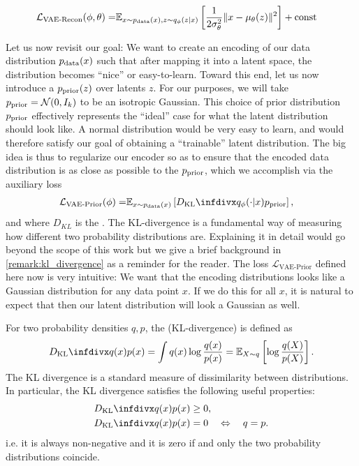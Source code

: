 \begin{align}
\mathcal{L}_{\text{VAE-Recon}}(\phi,\theta)=&\mathbb{E}_{x \sim p_{\rm{data}}(x),z\sim q_\phi(z|x)} \left[\frac{1}{2\sigma_\theta^2}\|x-\mu_\theta(z)\|^2\right]+\text{const}
\end{align}


Let us now revisit our goal: We want to create an encoding of our data distribution $p_{\rm{data}}(x)$ such that after mapping it into a latent space, the distribution becomes ``nice'' or easy-to-learn. Toward this end, let us now introduce a  $p_{\text{prior}}(z)$ over latents $z$. For our purposes, we will take $p_{\text{prior}}=\mathcal{N}(0,I_k)$ to be an isotropic Gaussian. This choice of prior distribution $p_{\text{prior}}$ effectively represents the ``ideal'' case for what the latent distribution should look like. A normal distribution would be very easy to learn, and would therefore satisfy our goal of obtaining a ``trainable'' latent distribution. The big idea is thus to regularize our encoder so as to ensure that the encoded data distribution is as close as possible to the $p_{\text{prior}}$, which we accomplish via the auxiliary loss
\begin{align}
\mathcal{L}_{\text{VAE-Prior}}(\phi)=&\EE_{x \sim \pdata(x)} \left[\dkl{q_\phi(\cdot|x)}{\prior}\right],
\end{align}
and where $D_{KL}$ is the  . The KL-divergence is a fundamental way of measuring how different two probability distributions are. Explaining it in detail would go beyond the scope of this work but we give a brief background in \cref{remark:kl_divergence} as a reminder for the reader.  The loss $\mathcal{L}_{\text{VAE-Prior}}$ defined here now is very intuitive: We want that the encoding distributions looks like a Gaussian distribution for any data point $x$. If we do this for all $x$, it is natural to expect that then our latent distribution will look a Gaussian as well.
\begin{remarkbox}
\label{remark:kl_divergence}
For two probability densities $q,p$, the  (KL-divergence) is defined as
\begin{align*}
    \dkl{q(x)}{p(x)}=\int q(x) \log \frac{q(x)}{p(x)}=\mathbb{E}_{X\sim q}\left[\log \frac{q(X)}{p(X)}\right].
\end{align*}
The KL divergence is a standard measure of dissimilarity between distributions. In particular, the KL divergence satisfies the following useful properties:
\begin{align}
\label{eq:kl_non_negative}
\dkl{q(x)}{p(x)}&\geq 0,\\
\dkl{q(x)}{p(x)}&=0\quad \Leftrightarrow \quad q=p.
\end{align}
i.e. it is always non-negative and it is zero if and only the two probability distributions coincide.
\end{remarkbox}

